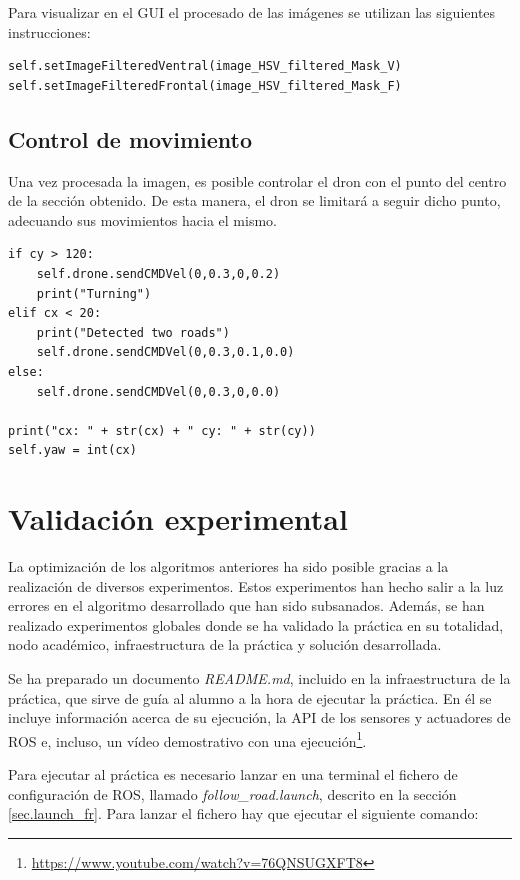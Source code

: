 Para visualizar en el GUI el procesado de las imágenes se utilizan las siguientes instrucciones:

\lstset{language=Python, breaklines=true, basicstyle=\footnotesize}
\begin{lstlisting}[frame=single]
self.setImageFilteredVentral(image_HSV_filtered_Mask_V)
self.setImageFilteredFrontal(image_HSV_filtered_Mask_F)
\end{lstlisting}

\subsection{Control de movimiento}
Una vez procesada la imagen, es posible controlar el dron con el punto del centro de la sección obtenido. De esta manera, el dron se limitará a seguir dicho punto, adecuando sus movimientos hacia el mismo.

\lstset{language=Python, breaklines=true, basicstyle=\footnotesize}
\begin{lstlisting}[frame=single]
if cy > 120:
    self.drone.sendCMDVel(0,0.3,0,0.2)
    print("Turning")
elif cx < 20:
    print("Detected two roads")
    self.drone.sendCMDVel(0,0.3,0.1,0.0)
else:
    self.drone.sendCMDVel(0,0.3,0,0.0)

print("cx: " + str(cx) + " cy: " + str(cy))
self.yaw = int(cx)
\end{lstlisting}

\section{Validación experimental}
La optimización de los algoritmos anteriores ha sido posible gracias a la realización de diversos experimentos. Estos experimentos han hecho salir a la luz errores en el algoritmo desarrollado que han sido subsanados.
Además, se han realizado experimentos globales donde se ha validado la práctica en su totalidad, nodo académico, infraestructura de la práctica y solución desarrollada.

Se ha preparado un documento \textit{README.md}, incluido en la infraestructura de la práctica, que sirve de guía al alumno a la hora de ejecutar la práctica. En él se incluye información acerca de su ejecución, la API de los sensores y actuadores de ROS e, incluso, un vídeo demostrativo con una ejecución\footnote{\url{https://www.youtube.com/watch?v=76QNSUGXFT8}}.

Para ejecutar al práctica es necesario lanzar en una terminal el fichero de configuración de ROS, llamado \textit{follow\_road.launch}, descrito en la sección \ref{sec.launch_fr}. Para lanzar el fichero hay que ejecutar el siguiente comando:

